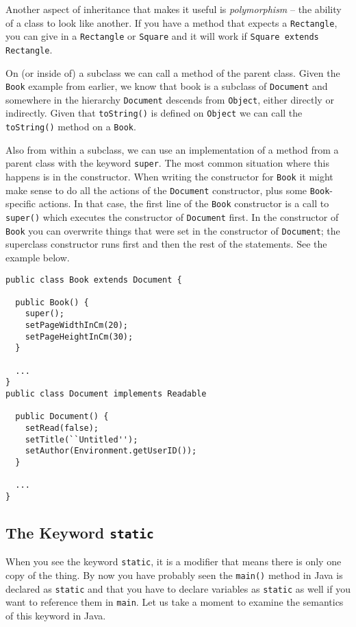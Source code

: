 Another aspect of inheritance that makes it useful is \textit{polymorphism} -- the ability of a class to look like another. If you have a method that expects a \texttt{Rectangle}, you can give in a \texttt{Rectangle} or \texttt{Square} and it will work if \texttt{Square extends Rectangle}.

On (or inside of) a subclass we can call a method of the parent class. Given the \texttt{Book} example from earlier, we know that book is a subclass of \texttt{Document} and somewhere in the hierarchy \texttt{Document} descends from \texttt{Object}, either directly or indirectly. Given that \texttt{toString()} is defined on \texttt{Object} we can call the \texttt{toString()} method on a \texttt{Book}.

Also from within a subclass, we can use an implementation of a method from a parent class with the keyword \texttt{super}. The most common situation where this happens is in the constructor. When writing the constructor for \texttt{Book} it might make sense to do all the actions of the \texttt{Document} constructor, plus some \texttt{Book}-specific actions. In that case, the first line of the \texttt{Book} constructor is a call to \texttt{super()} which executes the constructor of \texttt{Document} first. In the constructor of \texttt{Book} you can overwrite things that were set in the constructor of \texttt{Document}; the superclass constructor runs first and then the rest of the statements. See the example below.

\begin{verbatim}
public class Book extends Document {

  public Book() {
    super();
    setPageWidthInCm(20);
    setPageHeightInCm(30);
  }
  
  ...
}
public class Document implements Readable

  public Document() {
    setRead(false);
    setTitle(``Untitled'');
    setAuthor(Environment.getUserID());
  }
  
  ...
}
\end{verbatim}

\subsection*{The Keyword \texttt{static}}

When you see the keyword \texttt{static}, it is a modifier that means there is only one copy of the thing. By now you have probably seen the \texttt{main()} method in Java is declared as \texttt{static} and that you have to declare variables as \texttt{static} as well if you want to reference them in \texttt{main}. Let us take a moment to examine the semantics of this keyword in Java.

